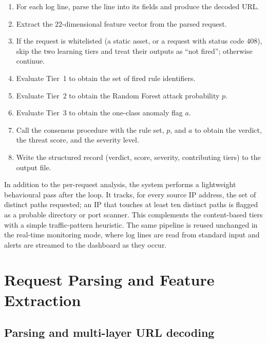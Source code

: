 \documentclass[../main.tex]{subfiles}
\begin{document}
\begin{enumerate}[leftmargin=1.8em, itemsep=2pt]
  \item For each log line, parse the line into its fields and produce the
        decoded URL.
  \item Extract the $22$-dimensional feature vector from the parsed request.
  \item If the request is whitelisted (a static asset, or a request with
        status code $408$), skip the two learning tiers and treat their
        outputs as ``not fired''; otherwise continue.
  \item Evaluate Tier~1 to obtain the set of fired rule identifiers.
  \item Evaluate Tier~2 to obtain the Random Forest attack probability $p$.
  \item Evaluate Tier~3 to obtain the one-class anomaly flag $a$.
  \item Call the consensus procedure with the rule set, $p$, and $a$ to
        obtain the verdict, the threat score, and the severity level.
  \item Write the structured record (verdict, score, severity, contributing
        tiers) to the output file.
\end{enumerate}

In addition to the per-request analysis, the system performs a lightweight
behavioural pass after the loop. It tracks, for every source IP address, the
set of distinct paths requested; an IP that touches at least ten distinct
paths is flagged as a probable directory or port scanner. This complements
the content-based tiers with a simple traffic-pattern heuristic. The same
pipeline is reused unchanged in the real-time monitoring mode, where log
lines are read from standard input and alerts are streamed to the dashboard
as they occur.

\section{Request Parsing and Feature Extraction}
\label{sec:pipeline-feat}

\subsection{Parsing and multi-layer URL decoding}
\end{document}
